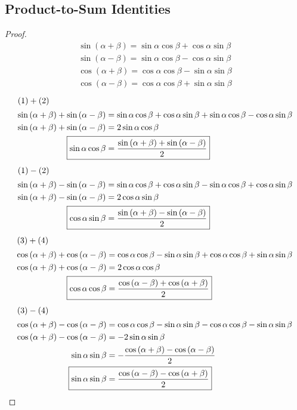 \documentclass{article}
\begin{document}
\subsection{Product-to-Sum Identities}
\label{proof:p2s}
\begin{proof}
	\begin{align}
		\sin\left(\alpha+\beta\right)=
		\sin\alpha\cos\beta+\cos\alpha\sin\beta \\
		\sin\left(\alpha-\beta\right)=
		\sin\alpha\cos\beta-\cos\alpha\sin\beta \\
		\cos\left(\alpha+\beta\right)=
		\cos\alpha\cos\beta-\sin\alpha\sin\beta \\
		\cos\left(\alpha-\beta\right)=
		\cos\alpha\cos\beta+\sin\alpha\sin\beta
	\end{align}
	\begin{align*}
		\intertext{\centering{$(1)+(2)$}}
		\sin\left(\alpha+\beta\right)+\sin\left(\alpha-\beta\right)&=
		\sin\alpha\cos\beta+\cos\alpha\sin\beta
		+\sin\alpha\cos\beta-\cos\alpha\sin\beta \\
		\sin\left(\alpha+\beta\right)+\sin\left(\alpha-\beta\right)&=
		2\sin\alpha\cos\beta \\
		\Aboxed{\sin\alpha\cos\beta&=\frac{\sin\left(\alpha+\beta\right)
		+\sin\left(\alpha-\beta\right)}{2}}
	\end{align*}
	\begin{align*}
		\intertext{\centering{$(1)-(2)$}}
		\sin\left(\alpha+\beta\right)-\sin\left(\alpha-\beta\right)&=
		\sin\alpha\cos\beta+\cos\alpha\sin\beta
		-\sin\alpha\cos\beta+\cos\alpha\sin\beta \\
		\sin\left(\alpha+\beta\right)-\sin\left(\alpha-\beta\right)&=
		2\cos\alpha\sin\beta \\
		\Aboxed{\cos\alpha\sin\beta&=\frac{\sin\left(\alpha+\beta\right)
		-\sin\left(\alpha-\beta\right)}{2}}
	\end{align*}
	\begin{align*}
		\intertext{\centering{$(3)+(4)$}}
		\cos\left(\alpha+\beta\right)+\cos\left(\alpha-\beta\right)&=
		\cos\alpha\cos\beta-\sin\alpha\sin\beta
		+\cos\alpha\cos\beta+\sin\alpha\sin\beta \\
		\cos\left(\alpha+\beta\right)+\cos\left(\alpha-\beta\right)&=
		2\cos\alpha\cos\beta \\
		\Aboxed{\cos\alpha\cos\beta&=\frac{\cos\left(\alpha-\beta\right)
		+\cos\left(\alpha+\beta\right)}{2}}
	\end{align*}
	\begin{align*}
		\intertext{\centering{$(3)-(4)$}}
		\cos\left(\alpha+\beta\right)-\cos\left(\alpha-\beta\right)&=
		\cos\alpha\cos\beta-\sin\alpha\sin\beta
		-\cos\alpha\cos\beta-\sin\alpha\sin\beta \\
		\cos\left(\alpha+\beta\right)-\cos\left(\alpha-\beta\right)&=
		-2\sin\alpha\sin\beta \\
		\sin\alpha\sin\beta&=-\frac{\cos\left(\alpha+\beta\right)
		-\cos\left(\alpha-\beta\right)}{2} \\
		\Aboxed{\sin\alpha\sin\beta&=\frac{\cos\left(\alpha-\beta\right)
		-\cos\left(\alpha+\beta\right)}{2}}
	\end{align*}
\end{proof}
\end{document}
